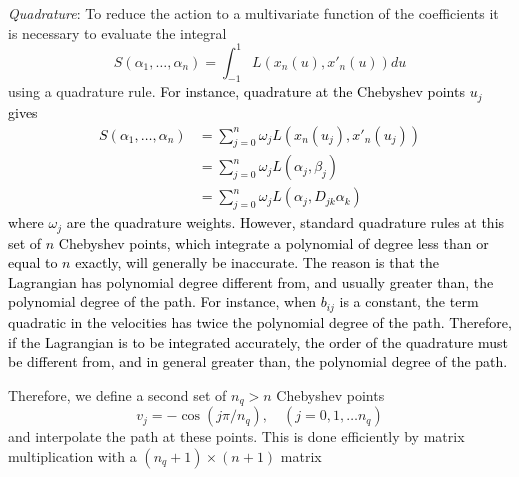 \emph{Quadrature}: To reduce the action to a multivariate function
of the coefficients it is necessary to evaluate the integral
\begin{equation}
S(\alpha_{1},\ldots,\alpha_{n})=\int_{-1}^{1}L(x_{n}(u),x'_{n}(u))du
\end{equation}
using a quadrature rule. \textcolor{black}{For instance, quadrature
at the Chebyshev points $u_{j}$ gives
\begin{align*}
S(\alpha_{1},\ldots,\alpha_{n}) & =\sum_{j=0}^{n}\omega_{j}L(x_{n}(u_{j}),x'_{n}(u_{j}))\\
 & =\sum_{j=0}^{n}\omega_{j}L(\alpha_{j},\beta_{j})\\
 & =\sum_{j=0}^{n}\omega_{j}L(\alpha_{j},D_{jk}\alpha_{k})
\end{align*}
where $\omega_{j}$ are the quadrature weights. However, standard
quadrature rules at this set of $n$ Chebyshev points, which integrate
a polynomial of degree less than or equal to $n$ exactly, will generally
be inaccurate. The reason is that the Lagrangian has polynomial degree
different from, and usually greater than, the polynomial degree of
the path. For instance, when $b_{ij}$ is a constant, the term quadratic
in the velocities has twice the polynomial degree of the path. Therefore,
if the Lagrangian is to be integrated accurately, the order of the
quadrature must be different from, and in general greater than, the
polynomial degree of the path.}

Therefore, we define a second set of $n_{q}>n$ Chebyshev points
\begin{equation}
v_{j}=-\cos(j\pi/n_{q}),\quad(j=0,1,\ldots n_{q})
\end{equation}
and interpolate the path at these points. This is done efficiently
by matrix multiplication with a $(n_{q}+1)\times(n+1)$ matrix

